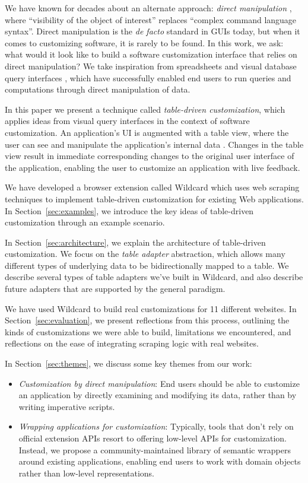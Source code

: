 \documentclass[sigplan,10pt,anonymous,review]{acmart}
\providecommand{\tightlist}{%
  \setlength{\itemsep}{0pt}\setlength{\parskip}{0pt}}
\begin{document}
We have known for decades about an alternate approach: \emph{direct
manipulation} \citep{shneiderman1983}, where ``visibility of the object
of interest'' replaces ``complex command language syntax''. Direct
manipulation is the \emph{de facto} standard in GUIs today, but when it
comes to customizing software, it is rarely to be found. In this work,
we ask: what would it look like to build a software customization
interface that relies on direct manipulation? We take inspiration from
spreadsheets and visual database query interfaces
\citep{2020a, bakke2016}, which have successfully enabled end users to
run queries and computations through direct manipulation of data.

In this paper we present a technique called \emph{table-driven
customization}, which applies ideas from visual query interfaces in the
context of software customization. An application's UI is augmented with
a table view, where the user can see and manipulate the application's
internal data . Changes in the table view result in immediate
corresponding changes to the original user interface of the application,
enabling the user to customize an application with live feedback.

We have developed a browser extension called Wildcard which uses web
scraping techniques to implement table-driven customization for existing
Web applications. In Section~\ref{sec:examples}, we introduce the key
ideas of table-driven customization through an example scenario.

In Section~\ref{sec:architecture}, we explain the architecture of
table-driven customization. We focus on the \emph{table adapter}
abstraction, which allows many different types of underlying data to be
bidirectionally mapped to a table. We describe several types of table
adapters we've built in Wildcard, and also describe future adapters that
are supported by the general paradigm.

We have used Wildcard to build real customizations for 11 different
websites. In Section~\ref{sec:evaluation}, we present reflections from
this process, outlining the kinds of customizations we were able to
build, limitations we encountered, and reflections on the ease of
integrating scraping logic with real websites.

In Section~\ref{sec:themes}, we discuss some key themes from our work:

\begin{itemize}
\tightlist
\item
  \emph{Customization by direct manipulation}: End users should be able
  to customize an application by directly examining and modifying its
  data, rather than by writing imperative scripts.
\item
  \emph{Wrapping applications for customization}: Typically, tools that
  don't rely on official extension APIs resort to offering low-level
  APIs for customization. Instead, we propose a community-maintained
  library of semantic wrappers around existing applications, enabling
  end users to work with domain objects rather than low-level
  representations.
\end{itemize}
\end{document}
